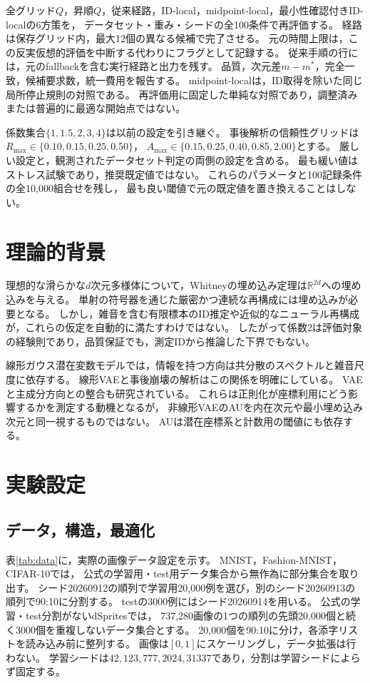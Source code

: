 \documentclass[11pt,a4paper]{ltjsarticle}
\begin{document}
全グリッド$Q$，昇順$Q$，従来経路，ID-local，midpoint-local，最小性確認付きID-localの6方策を，
データセット・重み・シードの全100条件で再評価する。
経路は保存グリッド内，最大12個の異なる候補で完了させる。
元の時間上限は，この反実仮想的評価を中断する代わりにフラグとして記録する。
従来手順の行には，元のfallbackを含む実行経路と出力を残す。
品質，次元差$m-m^*$，完全一致，候補要求数，統一費用を報告する。
midpoint-localは，ID取得を除いた同じ局所停止規則の対照である。
再評価用に固定した単純な対照であり，調整済みまたは普遍的に最適な開始点ではない。

係数集合$\{1,1.5,2,3,4\}$は以前の設定を引き継ぐ。
事後解析の信頼性グリッドは$R_{\max}\in\{0.10,0.15,0.25,0.50\}$，
$A_{\max}\in\{0.15,0.25,0.40,0.85,2.00\}$とする。
厳しい設定と，観測されたデータセット判定の両側の設定を含める。
最も緩い値はストレス試験であり，推奨既定値ではない。
これらのパラメータと100記録条件の全10,000組合せを残し，
最も良い閾値で元の既定値を置き換えることはしない。

\section{理論的背景}\label{sec:theory}
理想的な滑らかな$d$次元多様体について，Whitneyの埋め込み定理は$\mathbb R^{2d}$への埋め込みを与える\cite{whitney1944}。
単射の符号器を通じた厳密かつ連続な再構成には埋め込みが必要となる。
しかし，雑音を含む有限標本のID推定や近似的なニューラル再構成が，これらの仮定を自動的に満たすわけではない。
したがって係数2は評価対象の経験則であり，品質保証でも，測定IDから推論した下界でもない。

線形ガウス潜在変数モデルでは，情報を持つ方向は共分散のスペクトルと雑音尺度に依存する。
線形VAEと事後崩壊の解析はこの関係を明確にしている\cite{tippingbishop1999ppca,lucas2019elbo}。
VAEと主成分方向との整合も研究されている\cite{rolinek2019pca}。
これらは正則化が座標利用にどう影響するかを測定する動機となるが，
非線形VAEのAUを内在次元や最小埋め込み次元と同一視するものではない。
AUは潜在座標系と計数用の閾値にも依存する。

\section{実験設定}\label{sec:setup}

\subsection{データ，構造，最適化}
表\ref{tab:data}に，実際の画像データ設定を示す。
MNIST\cite{lecun1998}，Fashion-MNIST\cite{xiao2017fashion}，CIFAR-10\cite{krizhevsky2009learning}では，
公式の学習用・test用データ集合から無作為に部分集合を取り出す。
シード20260912の順列で学習用20,000例を選び，別のシード20260913の順列で90:10に分割する。
testの3000例にはシード20260914を用いる。
公式の学習・test分割がないdSprites\cite{matthey2017dsprites}では，
737,280画像の1つの順列の先頭20,000個と続く3000個を重複しないデータ集合とする。
20,000個を90:10に分け，各添字リストを読み込み前に整列する。
画像は$[0,1]$にスケーリングし，データ拡張は行わない。
学習シードは$42,123,777,2024,31337$であり，分割は学習シードによらず固定する。
\end{document}
